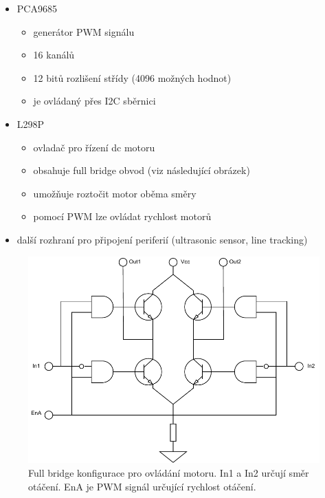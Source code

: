\begin{itemize}
	\item{PCA9685 \cite{pca9685}}
	\begin{itemize}
		\item{generátor PWM signálu}
		\item{16 kanálů}
		\item{12 bitů rozlišení střídy (4096 možných hodnot)}
		\item{je ovládaný přes I2C sběrnici}
	\end{itemize}
	\item{L298P}
	\begin{itemize}
		\item{ovladač pro řízení dc motoru}
		\item{obsahuje full bridge obvod (viz následující obrázek)}
		\item{umožňuje roztočit motor oběma směry}
		\item{pomocí PWM lze ovládat rychlost motorů}
	\end{itemize}
	\item{další rozhraní pro připojení periferií (ultrasonic sensor, line tracking)}
\end{itemize}

\begin{figure}[h!]
	\centering
	\includegraphics[scale=0.75]{obrazky-figures/motor_full_bridge.pdf}
	\caption{Full bridge konfigurace pro ovládání motoru. In1 a In2 určují směr otáčení. EnA je PWM signál určující rychlost otáčení. \cite{l298}}
	\label{}
\end{figure}


